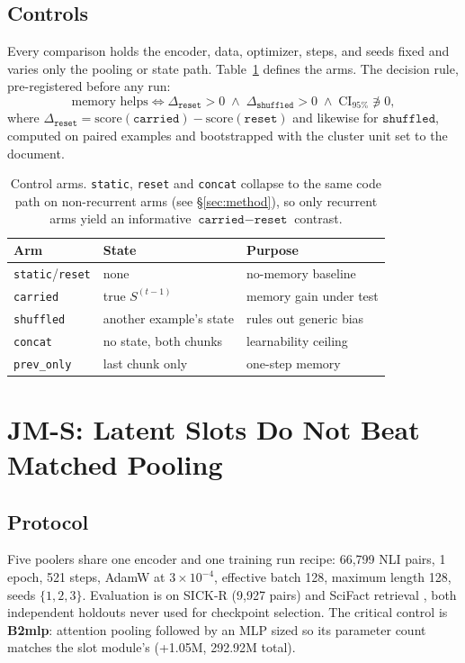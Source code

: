 \documentclass[10pt,twocolumn,letterpaper]{article}
\newcommand{\carried}{\texttt{carried}}
\newcommand{\reset}{\texttt{reset}}
\newcommand{\shuffled}{\texttt{shuffled}}
\newcommand{\concat}{\texttt{concat}}
\begin{document}
\subsection{Controls}

Every comparison holds the encoder, data, optimizer, steps, and seeds fixed and
varies only the pooling or state path. Table~\ref{tab:controls} defines the
arms. The decision rule, pre-registered before any run:
\begin{equation}
\text{memory helps} \iff
\Delta_{\reset}>0 \;\wedge\; \Delta_{\shuffled}>0
\;\wedge\; \text{CI}_{95\%}\!\not\ni 0 ,
\label{eq:criterion}
\end{equation}
where $\Delta_{\reset} = \mathrm{score}(\carried)-\mathrm{score}(\reset)$ and
likewise for $\shuffled$, computed on paired examples and bootstrapped with the
cluster unit set to the document.

\begin{table}[t]
\centering
\small
\caption{Control arms. \texttt{static}, \texttt{reset} and \texttt{concat}
collapse to the same code path on non-recurrent arms (see
\S\ref{sec:method}), so only recurrent arms yield an informative
$\carried-\reset$ contrast.}
\label{tab:controls}
\begin{tabular}{@{}lll@{}}
\toprule
Arm & State & Purpose \\
\midrule
\texttt{static}/\texttt{reset} & none & no-memory baseline \\
\carried & true $S^{(t-1)}$ & memory gain under test \\
\shuffled & another example's state & rules out generic bias \\
\concat & no state, both chunks & learnability ceiling \\
\texttt{prev\_only} & last chunk only & one-step memory \\
\bottomrule
\end{tabular}
\end{table}

\section{JM-S: Latent Slots Do Not Beat Matched Pooling}
\label{sec:jms}

\subsection{Protocol}

Five poolers share one encoder and one training run recipe: 66{,}799 NLI
pairs, 1 epoch, 521 steps, AdamW at $3\times10^{-4}$, effective batch 128,
maximum length 128, seeds $\{1,2,3\}$. Evaluation is on SICK-R (9{,}927 pairs)
and SciFact retrieval \citep{thakur2021}, both independent holdouts never used
for checkpoint selection. The critical control is \textbf{B2mlp}: attention pooling followed by
an MLP sized so its parameter count matches the slot module's
(+1.05M, 292.92M total).
\end{document}
